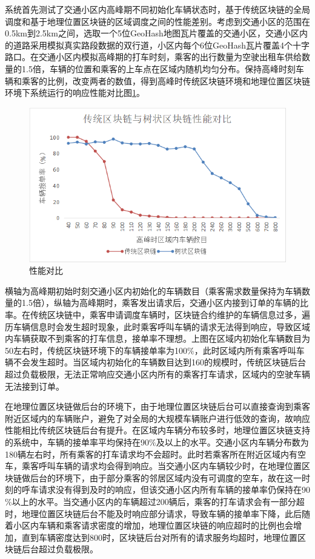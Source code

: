 系统首先测试了交通小区内高峰期不同初始化车辆状态时，基于传统区块链的全局调度和基于地理位置区块链的区域调度之间的性能差别。考虑到交通小区的范围在0.5km到2.5km之间，选取一个5位GeoHash地图瓦片覆盖的交通小区，交通小区内的道路采用模拟真实路段数据的双行道，小区内每个6位GeoHash瓦片覆盖4个十字路口。在交通小区内模拟高峰期的打车时刻，乘客的出行数量为空驶出租车供给数量的1.5倍，车辆的位置和乘客的上车点在区域内随机均匀分布。保持高峰时刻车辆和乘客的比例，改变两者的数值，得到高峰时传统区块链环境和地理位置区块链环境下系统运行的响应性能对比图\ref{fig:compare}。

\begin{figure}
  \centering
  \includegraphics[width=1.0\textwidth]{figures/性能对比}
  \caption{性能对比}\label{fig:compare}
\end{figure}

横轴为高峰期初始时刻交通小区内初始化的车辆数目（乘客需求数量保持为车辆数量的1.5倍），纵轴为高峰期时，乘客发出请求后，交通小区内接到订单的车辆的比率。在传统区块链中，乘客申请调度车辆时，区块链合约维护的车辆信息过多，遍历车辆信息时会发生超时现象，此时乘客呼叫车辆的请求无法得到响应，导致区域内车辆获取不到乘客的打车信息，接单率不理想。上图在区域内初始化车辆数目为50左右时，传统区块链环境下的车辆接单率为100$\%$，此时区域内所有乘客呼叫车辆不会发生超时。当区域内初始化的车辆数目达到160的规模时，传统区块链后台超过负载极限，无法正常响应交通小区内所有的乘客打车请求，区域内的空驶车辆无法接到订单。

​在地理位置区块链做后台的环境下，由于地理位置区块链后台可以直接查询到乘客附近区域内的车辆账户，避免了对全局的大规模车辆账户进行低效的查询，故响应性能相比传统区块链后台有提升。在区域内车辆分布较多时，地理位置区块链支持的系统中，车辆的接单率平均保持在90$\%$及以上的水平。交通小区内车辆分布数为180辆左右时，所有乘客的打车请求均不会超时。此时若乘客所在附近区域内有空车，乘客呼叫车辆的请求均会得到响应。当交通小区内车辆较少时，在地理位置区块链做后台的环境下，由于部分乘客的邻居区域内没有可调度的空车，故在这一时刻的呼车请求没有得到及时的响应，但该交通小区内所有车辆的接单率仍保持在90$\%$以上的水平。当交通小区内的车辆超过200辆后，乘客的打车请求会有一部分超时，地理位置区块链后台不能及时响应部分请求，导致车辆的接单率下降，此后随着小区内车辆和乘客请求密度的增加，地理位置区块链的响应超时的比例也会增加，直到车辆密度达到800时，区块链后台对所有的请求服务均超时，地理位置区块链后台超过负载极限。


